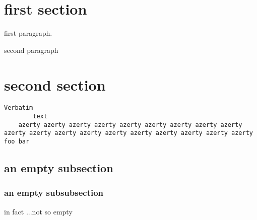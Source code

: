 \documentclass[12pt]{article}
\begin{document}
\section*{first section}

first paragraph.

\noindent
second paragraph%

\section{second section}

\begin{verbatim}
Verbatim
        text
	azerty azerty azerty azerty azerty azerty azerty azerty azerty azerty azerty azerty azerty azerty azerty azerty azerty azerty azerty
foo bar
\end{verbatim}

\subsection{an empty subsection}

\subsubsection{an empty subsubsection}
in fact%
    ...not so empty
\end{document}
